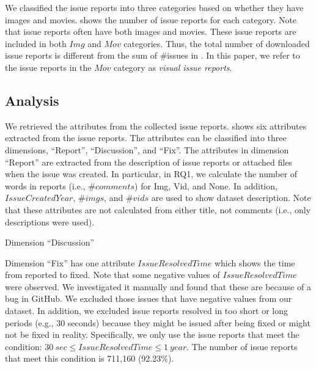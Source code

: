 
We classified the issue reports into three categories based on whether they have images and movies.  shows the number of issue reports for each category. 
Note that issue reports often have both images and movies. 
These issue reports are included in both $Img$ and $Mov$ categories. 
Thus, the total number of downloaded issue reports is different from 
the sum of \#issues in . 
In this paper, we refer to the issue reports in the $Mov$ category 
as \textit{visual issue reports}. 


% 
%

\subsection{Analysis}
We retrieved the attributes from the collected issue reports.
 shows six attributes extracted from the issue reports. The attributes can be classified into three dimensions, ``Report'', ``Discussion'', and ``Fix''. The attributes in dimension ``Report'' are extracted from the description of issue reports or attached files when the issue was created. In particular, in RQ1, we calculate the number of words in reports (i.e., $\#comments$) for Img, Vid, and None. 
In addition, $IssueCreatedYear$, $\#imgs$, and $\#vids$ are used to show dataset description. Note that these attributes are not calculated from either title, not comments (i.e., only descriptions were used). 

Dimension ``Discussion''

Dimension ``Fix'' has one attribute $IssueResolvedTime$ which shows the time from reported to fixed. 
Note that some negative values of $IssueResolvedTime$ were observed. We investigated it manually and found that these are because of a bug in GitHub.  We excluded those issues that have negative values from our dataset. 
In addition, we excluded issue reports resolved in too short or long periods (e.g., 30 seconds) because they might be issued after being fixed or might not be fixed in reality. 
Specifically, we only use the issue reports that meet the condition: $30\ sec \leq IssueResolvedTime \leq 1\ year$.
The number of issue reports that meet this condition is 711,160 (92.23\%).


